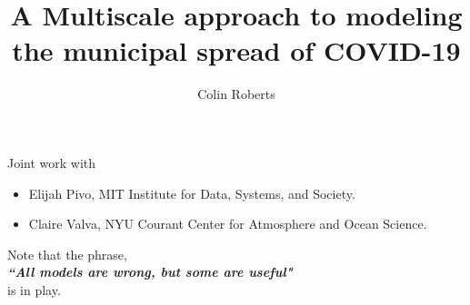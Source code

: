 \documentclass[aspectratio=169]{beamer}
\author{Colin Roberts}
\title{A Multiscale approach to modeling the municipal spread of COVID-19}
\subtitle{}
\newcommand\boldgreen[1]{\textcolor{lighter_csu_green}{\emph{\textbf{#1}}}}
\begin{document}
\begin{frame}{}
\vfill
    Joint work with
    \begin{itemize}
        \item Elijah Pivo, MIT Institute for Data, Systems, and Society.
        \item Claire Valva, NYU Courant Center for Atmosphere and Ocean Science.
    \end{itemize}
    \vfill
\end{frame}

\begin{frame}{}
\vfill
\center
    Note that the phrase,\\
    \vspace*{.5cm}
    \boldgreen{``All models are wrong, but some are useful"}\\
    \vspace*{.5cm}
    is in play.
\vfill 
\end{frame}
\end{document}
